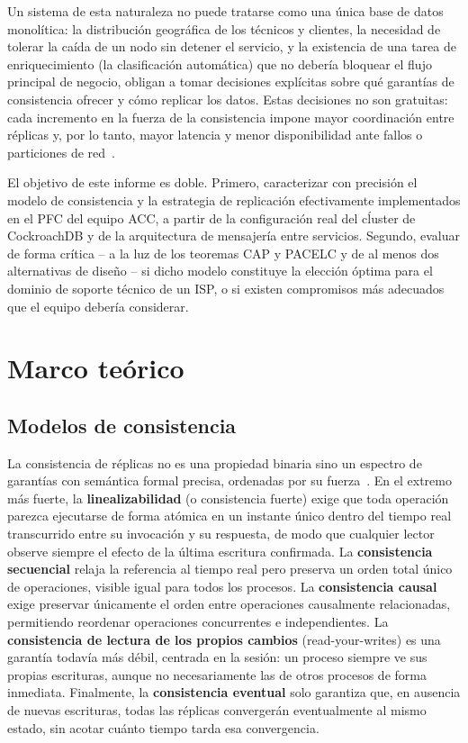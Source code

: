\documentclass[11pt,a4paper]{article}
\begin{document}
Un sistema de esta naturaleza no puede tratarse como una \'unica base de datos monol\'itica: la
distribuci\'on geogr\'afica de los t\'ecnicos y clientes, la necesidad de tolerar la ca\'ida de un
nodo sin detener el servicio, y la existencia de una tarea de enriquecimiento (la clasificaci\'on
autom\'atica) que no deber\'ia bloquear el flujo principal de negocio, obligan a tomar decisiones
expl\'icitas sobre qu\'e garant\'ias de consistencia ofrecer y c\'omo replicar los datos. Estas
decisiones no son gratuitas: cada incremento en la fuerza de la consistencia impone mayor
coordinaci\'on entre r\'eplicas y, por lo tanto, mayor latencia y menor disponibilidad ante fallos
o particiones de red~\cite{viotti2016}.

El objetivo de este informe es doble. Primero, caracterizar con precisi\'on el modelo de
consistencia y la estrategia de replicaci\'on efectivamente implementados en el PFC del equipo
ACC, a partir de la configuraci\'on real del c\'luster de CockroachDB y de la arquitectura de
mensajer\'ia entre servicios. Segundo, evaluar de forma cr\'itica -- a la luz de los teoremas CAP
y PACELC y de al menos dos alternativas de dise\~no -- si dicho modelo constituye la elecci\'on
\'optima para el dominio de soporte t\'ecnico de un ISP, o si existen compromisos m\'as adecuados
que el equipo deber\'ia considerar.

\section{Marco te\'orico}

\subsection{Modelos de consistencia}
\label{subsec:modelos}

La consistencia de r\'eplicas no es una propiedad binaria sino un espectro de garant\'ias con
sem\'antica formal precisa, ordenadas por su fuerza~\cite{viotti2016}. En el extremo m\'as fuerte,
la \textbf{linealizabilidad} (o consistencia fuerte) exige que toda operaci\'on parezca ejecutarse
de forma at\'omica en un instante \'unico dentro del tiempo real transcurrido entre su invocaci\'on
y su respuesta, de modo que cualquier lector observe siempre el efecto de la \'ultima escritura
confirmada. La \textbf{consistencia secuencial} relaja la referencia al tiempo real pero preserva
un orden total \'unico de operaciones, visible igual para todos los procesos. La
\textbf{consistencia causal} exige preservar \'unicamente el orden entre operaciones causalmente
relacionadas, permitiendo reordenar operaciones concurrentes e independientes. La
\textbf{consistencia de lectura de los propios cambios} (read-your-writes) es una garant\'ia
todav\'ia m\'as d\'ebil, centrada en la sesi\'on: un proceso siempre ve sus propias escrituras,
aunque no necesariamente las de otros procesos de forma inmediata. Finalmente, la
\textbf{consistencia eventual} solo garantiza que, en ausencia de nuevas escrituras, todas las
r\'eplicas converger\'an eventualmente al mismo estado, sin acotar cu\'anto tiempo tarda esa
convergencia.
\end{document}

